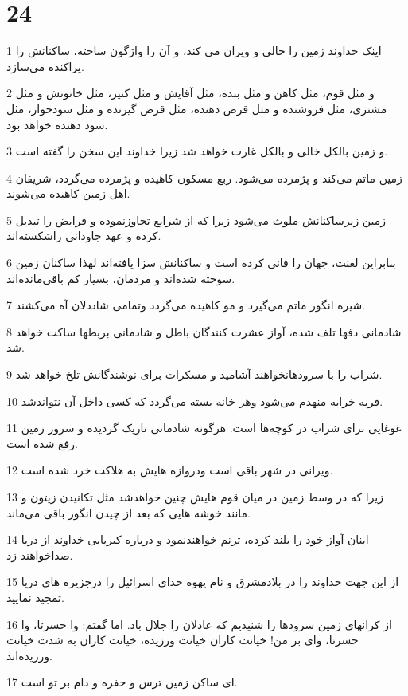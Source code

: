 \chapter{24}

\par 1 اینک خداوند زمین را خالی و ویران می کند، و آن را واژگون ساخته، ساکنانش را پراکنده می‌سازد.
\par 2 و مثل قوم، مثل کاهن و مثل بنده، مثل آقایش و مثل کنیز، مثل خاتونش و مثل مشتری، مثل فروشنده و مثل قرض دهنده، مثل قرض گیرنده و مثل سودخوار، مثل سود دهنده خواهد بود.
\par 3 و زمین بالکل خالی و بالکل غارت خواهد شد زیرا خداوند این سخن را گفته است.
\par 4 زمین ماتم می‌کند و پژمرده می‌شود. ربع مسکون کاهیده و پژمرده می‌گردد، شریفان اهل زمین کاهیده می‌شوند.
\par 5 زمین زیرساکنانش ملوث می‌شود زیرا که از شرایع تجاوزنموده و فرایض را تبدیل کرده و عهد جاودانی راشکسته‌اند.
\par 6 بنابراین لعنت، جهان را فانی کرده است و ساکنانش سزا یافته‌اند لهذا ساکنان زمین سوخته شده‌اند و مردمان، بسیار کم باقی‌مانده‌اند.
\par 7 شیره انگور ماتم می‌گیرد و مو کاهیده می‌گردد وتمامی شاددلان آه می‌کشند.
\par 8 شادمانی دفها تلف شده، آواز عشرت کنندگان باطل و شادمانی بربطها ساکت خواهد شد.
\par 9 شراب را با سرودهانخواهند آشامید و مسکرات برای نوشندگانش تلخ خواهد شد.
\par 10 قریه خرابه منهدم می‌شود وهر خانه بسته می‌گردد که کسی داخل آن نتواندشد.
\par 11 غوغایی برای شراب در کوچه‌ها است. هرگونه شادمانی تاریک گردیده و سرور زمین رفع شده است.
\par 12 ویرانی در شهر باقی است ودروازه هایش به هلاکت خرد شده است.
\par 13 زیرا که در وسط زمین در میان قوم هایش چنین خواهدشد مثل تکانیدن زیتون و مانند خوشه هایی که بعد از چیدن انگور باقی می‌ماند.
\par 14 اینان آواز خود را بلند کرده، ترنم خواهندنمود و درباره کبریایی خداوند از دریا صداخواهند زد.
\par 15 از این جهت خداوند را در بلادمشرق و نام یهوه خدای اسرائیل را درجزیره های دریا تمجید نمایید.
\par 16 از کرانهای زمین سرودها را شنیدیم که عادلان را جلال باد. اما گفتم: وا حسرتا، وا حسرتا، وای بر من! خیانت کاران خیانت ورزیده، خیانت کاران به شدت خیانت ورزیده‌اند.
\par 17 ‌ای ساکن زمین ترس و حفره و دام بر تو است.
